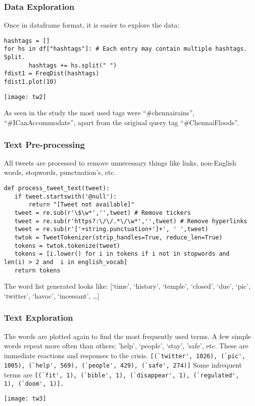 \begin{frame}[fragile]\frametitle{Data Exploration}
Once in dataframe format, it is easier to explore the data:
  \begin{lstlisting}
hashtags = []
for hs in df["hashtags"]: # Each entry may contain multiple hashtags. Split.
       hashtags += hs.split(" ")
fdist1 = FreqDist(hashtags)
fdist1.plot(10)
  \end{lstlisting}
  \begin{center}
\texttt{[image: tw2]}
\end{center}
As seen in the study the most used tags were ``\#chennairains'', ``\#ICanAccommodate'', apart from the original query tag ``\#ChennaiFloods''.
\end{frame}


\begin{frame}[fragile]\frametitle{Text Pre-processing}
All tweets are processed to remove unnecessary things like links, non-English words, stopwords, punctuation's, etc.
  \begin{lstlisting}
def process_tweet_text(tweet):
   if tweet.startswith('@null'):
       return "[Tweet not available]"
   tweet = re.sub(r'\$\w*','',tweet) # Remove tickers
   tweet = re.sub(r'https?:\/\/.*\/\w*','',tweet) # Remove hyperlinks
   tweet = re.sub(r'['+string.punctuation+']+', ' ',tweet) 
   twtok = TweetTokenizer(strip_handles=True, reduce_len=True)
   tokens = twtok.tokenize(tweet)
   tokens = [i.lower() for i in tokens if i not in stopwords and len(i) > 2 and  i in english_vocab]
   return tokens
  \end{lstlisting}
The word list generated looks like: [`time', `history', `temple', `closed', `due', `pic', `twitter', `havoc', `incessant', \ldots]
\end{frame}

\begin{frame}[fragile]\frametitle{Text Exploration}
The words are plotted again to find the most frequently used terms. A few simple words repeat more often than others: 'help', `people', `stay', 'safe', etc.
These are immediate reactions and responses to the crisis.
\lstinline|[(`twitter', 1026), (`pic', 1005), (`help', 569), (`people', 429), (`safe', 274)]|
Some infrequent terms are \lstinline|[(`fit', 1), (`bible', 1), (`disappear', 1), (`regulated', 1), (`doom', 1)].|
  \begin{center}
\texttt{[image: tw3]}
\end{center}
\end{frame}


